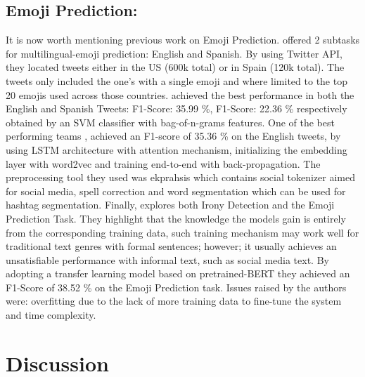 \documentclass[11pt]{article}
\begin{document}
\subsection{Emoji Prediction:}
It is now worth mentioning previous work on Emoji Prediction. \cite{barbieri-etal-2018-semeval} offered 2 subtasks for multilingual-emoji prediction: English and Spanish. By using Twitter API,
they located tweets either in the US (600k total) or in Spain (120k total). The tweets only included the one's with a single emoji and where limited to the top 20 emojis used across those countries. \cite{Tubingen_Olso} achieved 
the best performance in both the English and Spanish Tweets: F1-Score: 35.99 \%, F1-Score: 22.36 \% respectively obtained by an SVM classifier with bag-of-n-grams features. One of the best performing teams 
\cite{baziotis-etal-2018-ntua-slp}, achieved an F1-score of 35.36 \% on the English tweets, by using LSTM architecture with attention mechanism, initializing the embedding layer with word2vec and training end-to-end with back-propagation. 
The preprocessing tool they used was ekprahsis \cite{baziotis-etal-2017-datastories-semeval} which contains social tokenizer aimed for social media, spell correction and word segmentation which can be used for hashtag segmentation. Finally, \cite{towards_understanding_creatieve_lang}
explores both Irony Detection and the Emoji Prediction Task. They highlight that the knowledge the models gain is entirely from the corresponding training data, such training mechanism may work well for traditional text genres with formal sentences; however; 
it usually achieves an unsatisfiable performance with informal text, such as social media text.  By adopting a transfer learning model based on pretrained-BERT they achieved an F1-Score of 38.52 \% on the Emoji Prediction task. Issues raised by the authors were: overfitting 
due to the lack of more training data to fine-tune the system and time complexity.  
\section{Discussion}
\label{sec:discussion}


%


\end{document}
